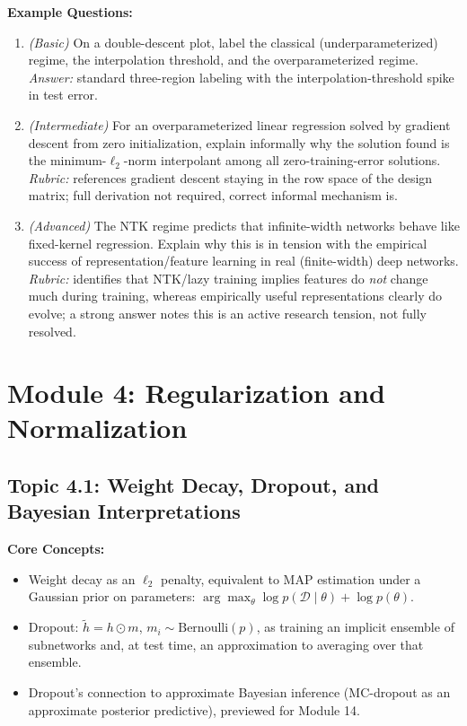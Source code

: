 \documentclass[11pt]{article}
\begin{document}
\textbf{Example Questions:}
\begin{enumerate}
  \item \textit{(Basic)} On a double-descent plot, label the classical (underparameterized) regime, the interpolation threshold, and the overparameterized regime. \\
  \textit{Answer:} standard three-region labeling with the interpolation-threshold spike in test error.
  \item \textit{(Intermediate)} For an overparameterized linear regression solved by gradient descent from zero initialization, explain informally why the solution found is the minimum-$\ell_2$-norm interpolant among all zero-training-error solutions. \\
  \textit{Rubric:} references gradient descent staying in the row space of the design matrix; full derivation not required, correct informal mechanism is.
  \item \textit{(Advanced)} The NTK regime predicts that infinite-width networks behave like fixed-kernel regression. Explain why this is in tension with the empirical success of representation/feature learning in real (finite-width) deep networks. \\
  \textit{Rubric:} identifies that NTK/lazy training implies features do \emph{not} change much during training, whereas empirically useful representations clearly do evolve; a strong answer notes this is an active research tension, not fully resolved.
\end{enumerate}

\section{Module 4: Regularization and Normalization}

\subsection{Topic 4.1: Weight Decay, Dropout, and Bayesian Interpretations}

\textbf{Core Concepts:}
\begin{itemize}
  \item Weight decay as an $\ell_2$ penalty, equivalent to MAP estimation under a Gaussian prior on parameters: $\arg\max_\theta \log p(\mathcal D \mid \theta) + \log p(\theta)$.
  \item Dropout: $\tilde h = h \odot m$, $m_i \sim \text{Bernoulli}(p)$, as training an implicit ensemble of subnetworks and, at test time, an approximation to averaging over that ensemble.
  \item Dropout's connection to approximate Bayesian inference (MC-dropout as an approximate posterior predictive), previewed for Module 14.
\end{itemize}
\end{document}
